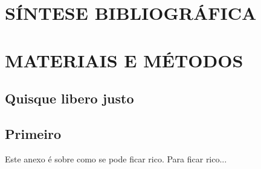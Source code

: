 \documentclass[12pt,oneside,a4paper,chapter=TITLE, english, french,	spanish, brazil]{abntex2-logatti}
\begin{document}
\chapter{SÍNTESE BIBLIOGRÁFICA}

\cleardoublepage
\chapter{MATERIAIS E MÉTODOS}








\postextual





\begin{apendicesenv}


\partapendices %


\chapter{Quisque libero justo}







\end{apendicesenv}




\begin{anexosenv}


\partanexos  %

\chapter{Primeiro}

Este anexo é sobre como se pode ficar rico. Para ficar rico...





\end{anexosenv}
\end{document}
